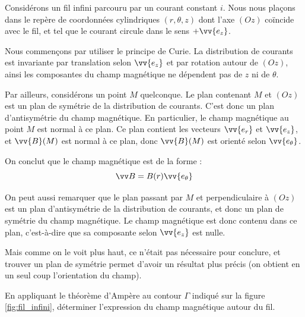 \documentclass[11pt,fleqn]{book} %
\begin{document}
Considérons un fil infini parcouru par un courant constant $i$. Nous nous plaçons dans le repère de coordonnées cylindriques $(r,\theta,z)$ dont l'axe $(Oz)$ coïncide avec le fil, et tel que le courant circule dans le sens $+\vv{e_z}$.

Nous commençons par utiliser le principe de Curie. La distribution de courants est invariante par translation selon $\vv{e_z}$ et par rotation autour de $(Oz)$, ainsi les composantes du champ magnétique ne dépendent pas de $z$ ni de $\theta$.

Par ailleurs, considérons un point $M$ quelconque. Le plan contenant $M$ et $(Oz)$ est un plan de symétrie de la distribution de courants. C'est donc un plan d'antisymétrie du champ magnétique. En particulier, le champ magnétique au point $M$ est normal à ce plan. Ce plan contient les vecteurs $\vv{e_r}$ et $\vv{e_z}$, et $\vv{B}(M)$ est normal à ce plan, donc $\vv{B}(M)$ est orienté selon $\vv{e_\theta}$.

On conclut que le champ magnétique est de la forme :
\begin{equation}
    \vv B = B(r) \vv{e_\theta}
\end{equation}

\begin{remark}
    On peut aussi remarquer que le plan passant par $M$ et perpendiculaire à $(Oz)$ est un plan d'antisymétrie de la distribution de courants, et donc un plan de symétrie du champ magnétique. Le champ magnétique est donc contenu dans ce plan, c'est-à-dire que sa composante selon $\vv{e_z}$ est nulle.

    Mais comme on le voit plus haut, ce n'était pas nécessaire pour conclure, et trouver un plan de symétrie permet d'avoir un résultat plus précis (on obtient en un seul coup l'orientation du champ).
\end{remark}

\begin{capex}
En appliquant le théorème d'Ampère au contour $\Gamma$ indiqué sur la figure \ref{fig:fil_infini}, déterminer l'expression du champ magnétique autour du fil.
\end{capex}
\end{document}
